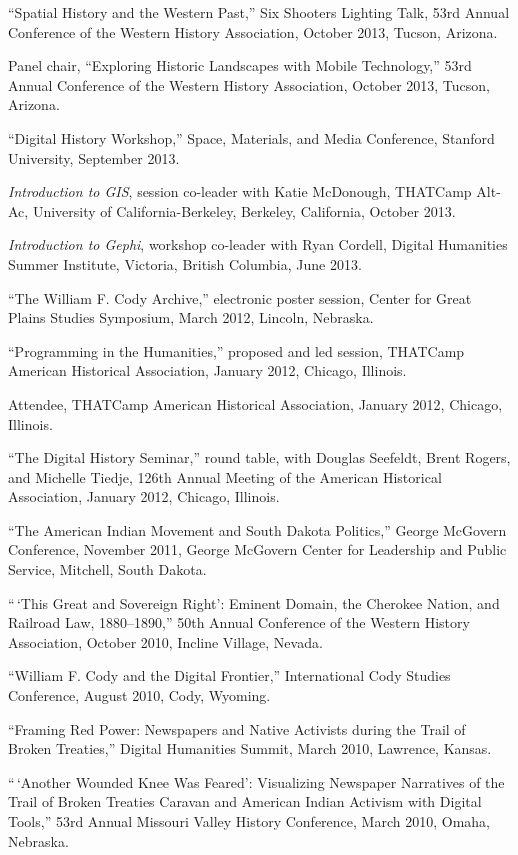 ``Spatial History and the Western Past,'' Six Shooters Lighting Talk,
53rd Annual Conference of the Western History Association, October 2013,
Tucson, Arizona.

Panel chair, ``Exploring Historic Landscapes with Mobile Technology,''
53rd Annual Conference of the Western History Association, October 2013,
Tucson, Arizona.

``Digital History Workshop,'' Space, Materials, and Media Conference,
Stanford University, September 2013.

\emph{Introduction to GIS}, session co-leader with Katie McDonough,
THATCamp Alt-Ac, University of California-Berkeley, Berkeley,
California, October 2013.

\emph{Introduction to Gephi}, workshop co-leader with Ryan Cordell,
Digital Humanities Summer Institute, Victoria, British Columbia, June
2013.

``The William F. Cody Archive,'' electronic poster session, Center for
Great Plains Studies Symposium, March 2012, Lincoln, Nebraska.

``Programming in the Humanities,'' proposed and led session, THATCamp
American Historical Association, January 2012, Chicago, Illinois.

Attendee, THATCamp American Historical Association, January 2012,
Chicago, Illinois.

``The Digital History Seminar,'' round table, with Douglas Seefeldt,
Brent Rogers, and Michelle Tiedje, 126th Annual Meeting of the American
Historical Association, January 2012, Chicago, Illinois.

``The American Indian Movement and South Dakota Politics,'' George
McGovern Conference, November 2011, George McGovern Center for
Leadership and Public Service, Mitchell, South Dakota.

``\,`This Great and Sovereign Right': Eminent Domain, the Cherokee
Nation, and Railroad Law, 1880--1890,'' 50th Annual Conference of the
Western History Association, October 2010, Incline Village, Nevada.

``William F. Cody and the Digital Frontier,'' International Cody Studies
Conference, August 2010, Cody, Wyoming.

``Framing Red Power: Newspapers and Native Activists during the Trail of
Broken Treaties,'' Digital Humanities Summit, March 2010, Lawrence,
Kansas.

``\,`Another Wounded Knee Was Feared': Visualizing Newspaper Narratives
of the Trail of Broken Treaties Caravan and American Indian Activism
with Digital Tools,'' 53rd Annual Missouri Valley History Conference,
March 2010, Omaha, Nebraska.

